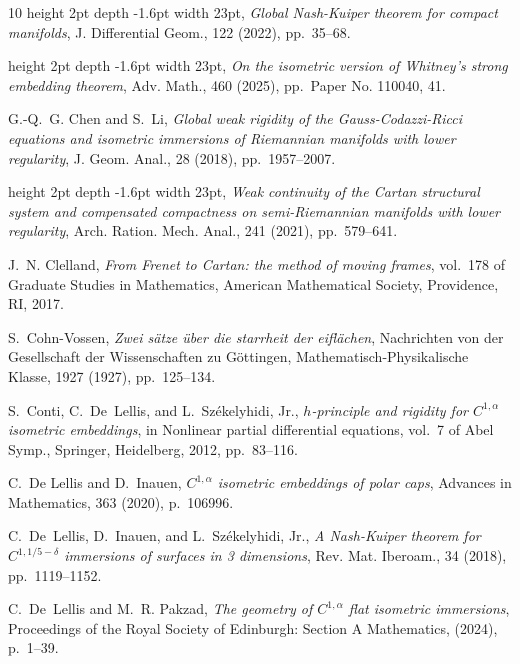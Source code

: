 \documentclass[12pt]{article}
\theoremstyle{plain}
\numberwithin{equation}{section}
\begin{document}
\begin{thebibliography}{10}
\leavevmode\vrule height 2pt depth -1.6pt width 23pt, {\em Global
  {N}ash-{K}uiper theorem for compact manifolds}, J. Differential Geom., 122
  (2022), pp.~35--68.

\leavevmode\vrule height 2pt depth -1.6pt width 23pt, {\em On the isometric
  version of {W}hitney's strong embedding theorem}, Adv. Math., 460 (2025),
  pp.~Paper No. 110040, 41.

{\sc G.-Q.~G. Chen and S.~Li}, {\em Global weak rigidity of the
  {G}auss-{C}odazzi-{R}icci equations and isometric immersions of {R}iemannian
  manifolds with lower regularity}, J. Geom. Anal., 28 (2018), pp.~1957--2007.

\leavevmode\vrule height 2pt depth -1.6pt width 23pt, {\em Weak continuity of
  the {C}artan structural system and compensated compactness on
  semi-{R}iemannian manifolds with lower regularity}, Arch. Ration. Mech.
  Anal., 241 (2021), pp.~579--641.

{\sc J.~N. Clelland}, {\em From {F}renet to {C}artan: the method of moving
  frames}, vol.~178 of Graduate Studies in Mathematics, American Mathematical
  Society, Providence, RI, 2017.

{\sc S.~Cohn-Vossen}, {\em Zwei sätze über die starrheit der eiflächen},
  Nachrichten von der Gesellschaft der Wissenschaften zu Göttingen,
  Mathematisch-Physikalische Klasse, 1927 (1927), pp.~125--134.

{\sc S.~Conti, C.~De~Lellis, and L.~Sz\'{e}kelyhidi, Jr.}, {\em {$h$}-principle
  and rigidity for {$C^{1,\alpha}$} isometric embeddings}, in Nonlinear partial
  differential equations, vol.~7 of Abel Symp., Springer, Heidelberg, 2012,
  pp.~83--116.

{\sc C.~{De Lellis} and D.~Inauen}, {\em ${C}^{1,\alpha}$ isometric embeddings
  of polar caps}, Advances in Mathematics, 363 (2020), p.~106996.

{\sc C.~De~Lellis, D.~Inauen, and L.~Sz\'ekelyhidi, Jr.}, {\em A
  {N}ash-{K}uiper theorem for {$C^{1,1/5-\delta}$} immersions of surfaces in 3
  dimensions}, Rev. Mat. Iberoam., 34 (2018), pp.~1119--1152.

{\sc C.~De~Lellis and M.~R. Pakzad}, {\em The geometry of ${C}^{1,\alpha}$ flat
  isometric immersions}, Proceedings of the Royal Society of Edinburgh: Section
  A Mathematics,  (2024), p.~1–39.


\end{thebibliography}
\end{document}
